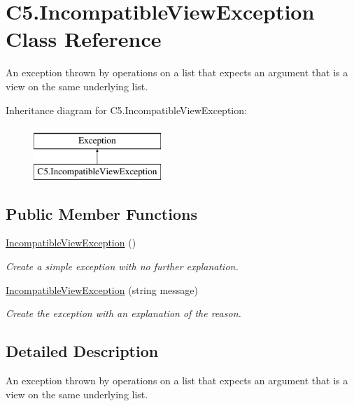 \hypertarget{class_c5_1_1_incompatible_view_exception}{}\section{C5.\+Incompatible\+View\+Exception Class Reference}
\label{class_c5_1_1_incompatible_view_exception}


An exception thrown by operations on a list that expects an argument that is a view on the same underlying list.  


Inheritance diagram for C5.\+Incompatible\+View\+Exception\+:\begin{figure}[H]
\begin{center}
\leavevmode
\includegraphics[height=2.000000cm]{class_c5_1_1_incompatible_view_exception}
\end{center}
\end{figure}
\subsection*{Public Member Functions}
\begin{DoxyCompactItemize}
\item 
\hyperlink{class_c5_1_1_incompatible_view_exception_a2213279b2e6743b6355cc0ad598393b0}{Incompatible\+View\+Exception} ()
\begin{DoxyCompactList}\small\item\em Create a simple exception with no further explanation. \end{DoxyCompactList}\item 
\hyperlink{class_c5_1_1_incompatible_view_exception_a61a8a3695642eaa2bc67c47ec245490b}{Incompatible\+View\+Exception} (string message)
\begin{DoxyCompactList}\small\item\em Create the exception with an explanation of the reason. \end{DoxyCompactList}\end{DoxyCompactItemize}


\subsection{Detailed Description}
An exception thrown by operations on a list that expects an argument that is a view on the same underlying list. 



